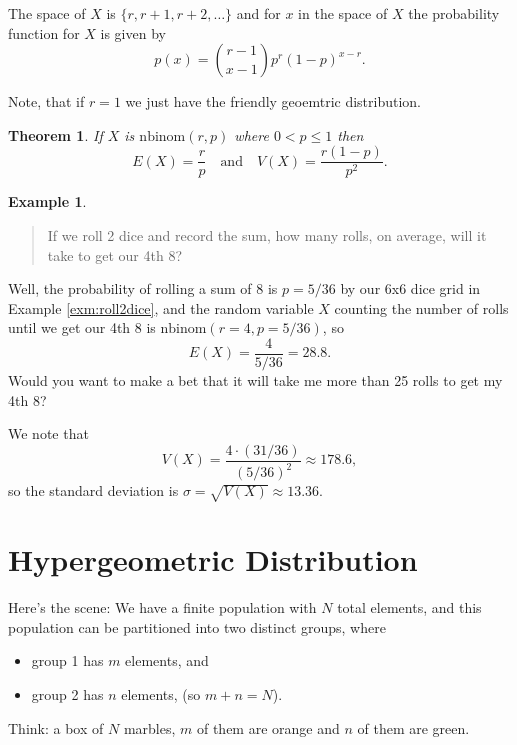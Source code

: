 \documentclass[
]{book}
\providecommand{\tightlist}{%
  \setlength{\itemsep}{0pt}\setlength{\parskip}{0pt}}
\newtheorem{theorem}{Theorem}[chapter]
\theoremstyle{definition}
\theoremstyle{definition}
\newtheorem{example}{Example}[chapter]
\theoremstyle{definition}
\theoremstyle{definition}
\theoremstyle{remark}
\begin{document}
The space of \(X\) is \(\{r, r+1, r+2, \ldots\}\) and for \(x\) in the space of \(X\) the probability function for \(X\) is given by \[p(x) = \binom{r-1}{x-1}p^r(1-p)^{x-r}.\]

Note, that if \(r=1\) we just have the friendly geoemtric distribution.

\begin{theorem}
\protect\hypertarget{thm:negative-binomial-EandV}{}\label{thm:negative-binomial-EandV}If \(X\) is \(\text{nbinom}(r,p)\) where \(0<p\leq 1\) then
\[E(X) = \frac{r}{p} ~~~ \text{ and } ~~~ V(X) = \frac{r(1-p)}{p^2}.\]
\end{theorem}

\begin{example}
\leavevmode

\begin{quote}
If we roll 2 dice and record the sum, how many rolls, on average, will it take to get our 4th 8?
\end{quote}

Well, the probability of rolling a sum of 8 is \(p = 5/36\) by our 6x6 dice grid in Example \ref{exm:roll2dice}, and the random variable \(X\) counting the number of rolls until we get our 4th 8 is \(\text{nbinom}(r=4,p=5/36)\), so \[E(X) = \frac{4}{5/36} = 28.8.\] Would you want to make a bet that it will take me more than 25 rolls to get my 4th 8?

We note that \[V(X) = \frac{4\cdot (31/36)}{(5/36)^2} \approx 178.6,\] so the standard deviation is \(\sigma = \sqrt{V(X)} \approx 13.36\).

\end{example}

\section{Hypergeometric Distribution}\label{hypergometric}

Here's the scene: We have a finite population with \(N\) total elements, and this population can be partitioned into two distinct groups, where

\begin{itemize}
\tightlist
\item
  group 1 has \(m\) elements, and
\item
  group 2 has \(n\) elements, (so \(m + n = N\)).
\end{itemize}

Think: a box of \(N\) marbles, \(m\) of them are orange and \(n\) of them are green.
\end{document}
